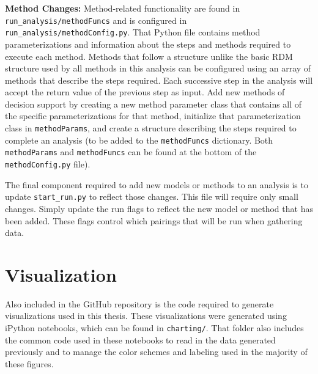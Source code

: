 \textbf{Method Changes: } Method-related functionality are found in \texttt{run_analysis/methodFuncs} and is configured in \texttt{run_analysis/methodConfig.py}. That Python file contains method parameterizations and information about the steps and methods required to execute each method. Methods that follow a structure unlike the basic RDM structure used by all methods in this analysis can be configured using an array of methods that describe the steps required. Each successive step in the analysis will accept the return value of the previous step as input. Add new methods of decision support by creating a new method parameter class that contains all of the specific parameterizations for that method, initialize that parameterization class in \texttt{methodParams}, and create a structure describing the steps required to complete an analysis (to be added to the \texttt{methodFuncs} dictionary. Both \texttt{methodParams} and \texttt{methodFuncs} can be found at the bottom of the \texttt{methodConfig.py} file).

The final component required to add new models or methods to an analysis is to update \texttt{start_run.py} to reflect those changes. This file will require only small changes. Simply update the run flags to reflect the new model or method that has been added. These flags control which pairings that will be run when gathering data.

\section{Visualization}
Also included in the GitHub repository is the code required to generate visualizations used in this thesis. These visualizations were generated using iPython notebooks, which can be found in \texttt{charting/}. That folder also includes the common code used in these notebooks to read in the data generated previously and to manage the color schemes and labeling used in the majority of these figures.  